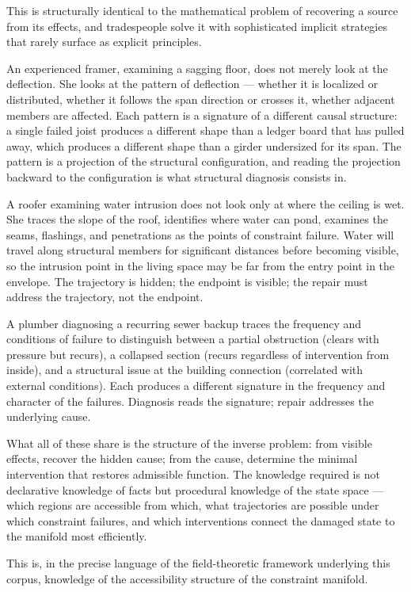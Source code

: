 \documentclass[11pt, a4paper]{article}
\theoremstyle{definition}
\theoremstyle{remark}
\begin{document}
This is structurally identical to the mathematical problem of recovering a
source from its effects, and tradespeople solve it with sophisticated implicit
strategies that rarely surface as explicit principles.

An experienced framer, examining a sagging floor, does not merely look at the
deflection. She looks at the pattern of deflection --- whether it is localized
or distributed, whether it follows the span direction or crosses it, whether
adjacent members are affected. Each pattern is a signature of a different causal
structure: a single failed joist produces a different shape than a ledger board
that has pulled away, which produces a different shape than a girder undersized
for its span. The pattern is a projection of the structural configuration, and
reading the projection backward to the configuration is what structural
diagnosis consists in.

A roofer examining water intrusion does not look only at where the ceiling is
wet. She traces the slope of the roof, identifies where water can pond, examines
the seams, flashings, and penetrations as the points of constraint failure. Water
will travel along structural members for significant distances before becoming
visible, so the intrusion point in the living space may be far from the entry
point in the envelope. The trajectory is hidden; the endpoint is visible; the
repair must address the trajectory, not the endpoint.

A plumber diagnosing a recurring sewer backup traces the frequency and
conditions of failure to distinguish between a partial obstruction (clears with
pressure but recurs), a collapsed section (recurs regardless of intervention
from inside), and a structural issue at the building connection (correlated with
external conditions). Each produces a different signature in the frequency and
character of the failures. Diagnosis reads the signature; repair addresses the
underlying cause.

What all of these share is the structure of the inverse problem: from visible
effects, recover the hidden cause; from the cause, determine the minimal
intervention that restores admissible function. The knowledge required is not
declarative knowledge of facts but procedural knowledge of the state space ---
which regions are accessible from which, what trajectories are possible under
which constraint failures, and which interventions connect the damaged state to
the manifold most efficiently.

This is, in the precise language of the field-theoretic framework underlying
this corpus, knowledge of the accessibility structure of the constraint manifold.
\end{document}
